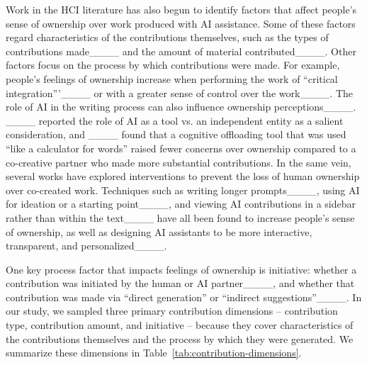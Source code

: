 Work in the HCI literature has also begun to identify factors that affect people's sense of ownership over work produced with AI assistance. Some of these factors regard characteristics of the contributions themselves, such as the types of contributions made____ and the amount of material contributed____. Other factors focus on the process by which contributions were made. For example, people's feelings of ownership increase when performing the work of ``critical integration'''____ or with a greater sense of control over the work____. The role of AI in the writing process can also influence ownership perceptions____. ____ reported the role of AI as a tool vs. an independent entity as a salient consideration, and ____ found that a cognitive offloading tool that was used ``like a calculator for words'' raised fewer concerns over ownership compared to a co-creative partner who made more substantial contributions. In the same vein, several works have explored interventions to prevent the loss of human ownership over co-created work. Techniques such as writing longer prompts____, using AI for ideation or a starting point____, and viewing AI contributions in a sidebar rather than within the text____ have all been found to increase people's sense of ownership, as well as designing AI assistants to be more interactive, transparent, and personalized____.

One key process factor that impacts feelings of ownership is initiative: whether a contribution was initiated by the human or AI partner____, and whether that contribution was made via ``direct generation'' or ``indirect suggestions''____. In our study, we sampled three primary contribution dimensions -- contribution type, contribution amount, and initiative -- because they cover characteristics of the contributions themselves and the process by which they were generated. We summarize these dimensions in Table~\ref{tab:contribution-dimensions}.

